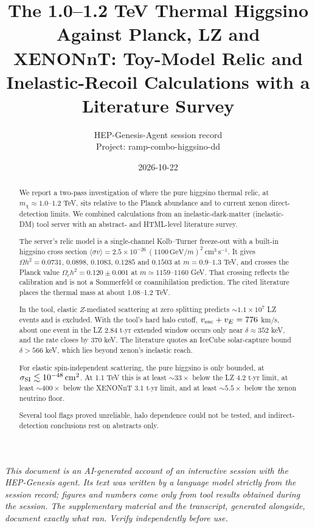\documentclass[11pt,a4paper]{article}
\title{The 1.0--1.2 TeV Thermal Higgsino Against Planck, LZ and XENONnT: Toy-Model Relic and Inelastic-Recoil Calculations with a Literature Survey}
\author{HEP-Genesis-Agent session record \\ \small Project: ramp-combo-higgsino-dd}
\date{2026-10-22}
\begin{document}
\maketitle
\noindent\textit{\small This document is an AI-generated account of an interactive session with the HEP-Genesis agent. Its text was written by a language model strictly from the session record; figures and numbers come only from tool results obtained during the session. The supplementary material and the transcript, generated alongside, document exactly what ran. Verify independently before use.}
\vspace{1em}

\begin{abstract}
We report a two-pass investigation of where the pure higgsino thermal relic, at $m_\chi \approx 1.0$--$1.2$ TeV, sits relative to the Planck abundance and to current xenon direct-detection limits. We combined calculations from an inelastic-dark-matter (inelastic-DM) tool server with an abstract- and HTML-level literature survey.

The server's relic model is a single-channel Kolb--Turner freeze-out with a built-in higgsino cross section $\langle\sigma v\rangle = 2.5\times10^{-26}\,(1100\,\mathrm{GeV}/m)^2\ \mathrm{cm^3\,s^{-1}}$. It gives $\Omega h^2 = 0.0731$, $0.0898$, $0.1083$, $0.1285$ and $0.1503$ at $m = 0.9$--$1.3$ TeV, and crosses the Planck value $\Omega_c h^2 = 0.120\pm0.001$ at $m \simeq 1159$--$1160$ GeV. That crossing reflects the calibration and is not a Sommerfeld or coannihilation prediction. The cited literature places the thermal mass at about 1.08--1.2 TeV.

In the tool, elastic $Z$-mediated scattering at zero splitting predicts $\sim1.1\times10^{7}$ LZ events and is excluded. With the tool's hard halo cutoff, $v_{\rm esc}+v_E = 776$ km/s, about one event in the LZ 2.84 t$\cdot$yr extended window occurs only near $\delta \approx 352$ keV, and the rate closes by 370 keV. The literature quotes an IceCube solar-capture bound $\delta > 566$ keV, which lies beyond xenon's inelastic reach.

For elastic spin-independent scattering, the pure higgsino is only bounded, at $\sigma_{\rm SI}\lesssim10^{-48}\,\mathrm{cm^2}$. At 1.1 TeV this is at least $\sim33\times$ below the LZ 4.2 t$\cdot$yr limit, at least $\sim400\times$ below the XENONnT 3.1 t$\cdot$yr limit, and at least $\sim5.5\times$ below the xenon neutrino floor.

Several tool flags proved unreliable, halo dependence could not be tested, and indirect-detection conclusions rest on abstracts only.
\end{abstract}
\end{document}
